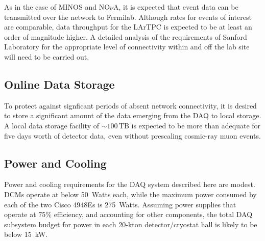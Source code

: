 As in the case of MINOS and NO$\nu$A, it is expected that event data can be 
transmitted over the network to Fermilab.  Although rates for events of 
interest are comparable, data throughput for the \LBNE LArTPC is 
expected to be at least an order of magnitude higher.  A detailed 
analysis of the requirements of Sanford Laboratory for the appropriate level of 
connectivity within and off the lab site will need to be carried out.

\subsection{Online Data Storage}

To protect against signficant periods of absent network connectivity, it 
is desired to store a significant amount of the data emerging from the 
DAQ to local storage.  A local data storage facility of $\sim 100\,$TB is 
expected to be more than adequate for five days worth of detector data, 
even without prescaling cosmic-ray muon events.

\subsection{Power and Cooling}

Power and cooling requirements for the DAQ system described here are 
modest.  DCMs operate at below 50~Watts each, while the maximum power 
consumed by each of the two Cisco 4948Es is 275~Watts.  Assuming 
power supplies that operate at 75\% efficiency, and accounting for 
other components, the total DAQ subsystem budget for power 
in each 20-kton detector/cryostat hall is likely to be below 15~kW.


